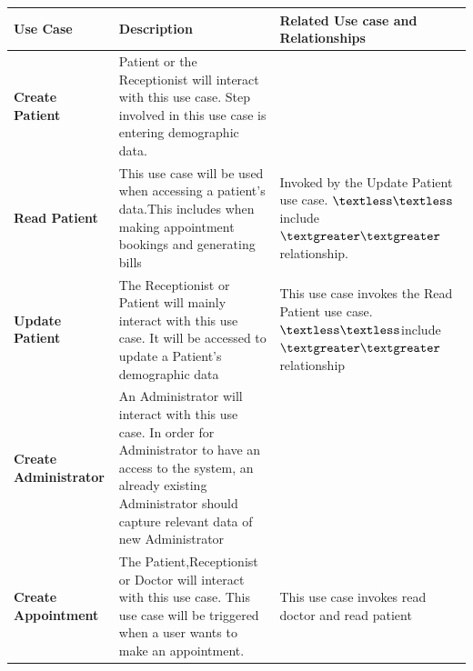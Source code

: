 \documentclass[11 pt]{article}
\begin{document}
\begin{tabular}{|p{3cm}|p{4.5cm}|p{4.5cm}|}
\hline
\textbf{Use Case} & \textbf{Description} & \textbf{Related Use case and Relationships} \\
\hline
\textbf{Create Patient} & Patient or the Receptionist will interact with this use case. Step involved in this use case is entering demographic data. &\\
\hline
\textbf{Read Patient}& This use case will be used when accessing a patient's data.This includes when making appointment bookings and generating bills & Invoked by the Update Patient use case. $\textless\textless$include$\textgreater\textgreater$ relationship.\\
\hline
\textbf{Update Patient}& The Receptionist or Patient will mainly interact with this use case. It will be accessed to update a Patient's demographic data & This use case invokes the Read Patient use case. $\textless\textless$include$\textgreater\textgreater$ relationship\\
\hline
\textbf{Create Administrator}& An Administrator will interact with this use case. In order for Administrator to have an access to the system, an already existing Administrator should capture relevant data of new Administrator &\\
\hline
\textbf{Create Appointment}& The Patient,Receptionist or Doctor will interact with this use case. This use case will be triggered when a user wants to make an appointment. & This use case invokes read doctor and read patient\\

\hline

\end{tabular}
\end{document}
